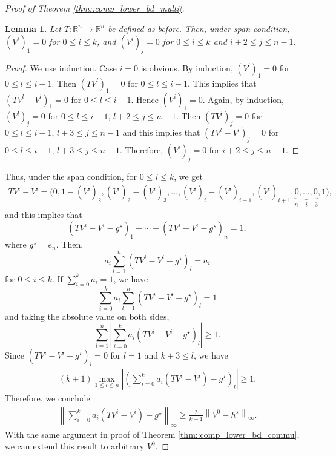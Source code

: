 \documentclass{article} %
\newcommand{\cA}{\mathcal{A}}
\newcommand{\cS}{\mathcal{S}}
\newcommand{\cP}{\mathcal{P}}
\newcommand{\real}{\mathbb{R}}
\newcommand{\abs}[1]{\left|{#1}\right|}
\newcommand*{\para}[1]{\left({#1}\right)}
\newcommand*{\infn}[1]{\left\|{#1}\right\|_{\infty}}
\newtheorem{lemma}{Lemma}
\begin{document}
\begin{proof}[Proof of Theorem \ref{thm::comp_lower_bd_multi}]
\begin{lemma}
Let $T \colon\real^{n} \rightarrow \real^{n}$ be defined as before. Then, under span condition, $\para{V^i}_{1}=0$ for $0\le i \le k $, and $\para{V^i}_{j}=0$ for $ 0\le i \le k$ and $i+2 \le j \le n-1$.
\end{lemma}
\begin{proof}
     We use induction. Case $i=0$ is obvious. By induction, $\para{V^l}_1=0$ for $0 \le l \le i-1$. Then $\para{TV^l}_1=0$ for $0 \le l \le i-1$.  This implies that  $\para{TV^l-V^l}_1=0$ for $0 \le l \le i-1$. Hence $\para{V^i}_1=0$. Again, by induction, $\para{V^l}_j=0$ for $0 \le l \le i-1$, $l+2 \le j \le n-1$. Then $\para{TV^l}_j=0$ for $0 \le l \le i-1$, $l+3 \le j \le n-1$ and this implies that $\para{TV^l-V^l}_j=0$ for $0 \le l \le i-1$, $l+3 \le j \le n-1$. Therefore, $\para{V^i}_{j}=0$ for $i+2 \le j \le n-1$. 
\end{proof}
Thus, under the span condition, for $ 0 \le i \le k$, we get
\begin{align*}
    TV^i-V^i =\Big(0, 1-\para{V^i}_2,\para{V^i}_2 -\para{V^i}_3, \dots, \para{V^i}_{i}-\para{V^i}_{i+1}, \para{V^i}_{i+1}, \underbrace{0, \dots, 0}_{n-i-3}, 1\Big),
\end{align*}
and this implies that
\[ (TV^i-V^i-g^{\star})_1 + \cdots +(TV^i-V^i-g^{\star})_{n} = 1, \]
where $g^{\star}=e_n $. Then,
\[ a_i\sum^n_{l=1}(TV^i-V^i-g^{\star})_l = a_i \]
for $ 0 \le i \le k$. If $\sum^{k}_{i=0}a_i=1$, we have
\[\sum^{k}_{i=0} a_i\sum^n_{l=1}(TV^i-V^i-g^{\star})_l = 1\]
and taking the absolute value on both sides, 
\[\sum^n_{l=1} \abs{\sum^{k}_{i=0} a_i(TV^i-V^i-g^{\star})_l} \ge 1.\]
Since $(TV^i-V^i-g^{\star})_l=0$ for $l=1$ and $k+3 \le l$, we have
\begin{align*}
     (k+1)\max_{1\le l\le n} {\abs{\para{\sum^{k}_{i=0} a_i(TV^i-V^i)-g^{\star}}_l}} \ge 1.
\end{align*}
Therefore, we conclude
\begin{align*}\infn{\sum^{k}_{i=0} a_i(TV^i-V^i)-g^{\star}} \ge \frac{2}{k+1} \infn{V^0-h^{\star}}.
\end{align*}
With the same argument in proof of Theorem \ref{thm::comp_lower_bd_commu}, we can extend this result to arbitrary $V^0$.

\end{proof}
\end{document}
